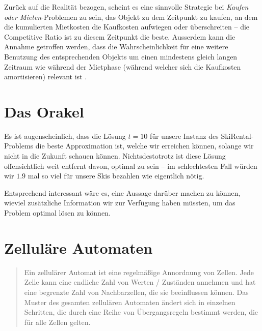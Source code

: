 \documentclass[11pt]{scrreprt} %
\theoremstyle{definition}
\begin{document}
\bigskip
Zurück auf die Realität bezogen, scheint es eine sinnvolle Strategie bei {\sl Kaufen oder Mieten}-Problemen zu sein, das Objekt zu dem Zeitpunkt zu kaufen, an dem die kumulierten Mietkosten die Kaufkosten aufwiegen oder überschreiten -- die Competitive Ratio ist zu diesem Zeitpunkt die beste. Ausserdem kann die Annahme getroffen werden, dass die Wahrscheinlichkeit für eine weitere Benutzung des entsprechenden Objekts um einen mindestens gleich langen Zeitraum wie während der Mietphase (während welcher sich die Kaufkosten amortisieren) relevant ist \cite{Trevisan}.


\section{Das Orakel}

Es ist augenscheinlich, dass die Lösung $t = 10$ für unsere Instanz des {\sc SkiRental}-Problems die beste Approximation ist, welche wir erreichen können, solange wir nicht in die Zukunft schauen können. Nichtsdestotrotz ist diese Lösung offensichtlich weit entfernt davon, optimal zu sein -- im schlechtesten Fall würden wir $1.9$ mal so viel für unsere Skis bezahlen wie eigentlich nötig.

\bigskip
Entsprechend interessant wäre es, eine Aussage darüber machen zu können, wieviel zusätzliche Information wir zur Verfügung haben müssten, um das Problem optimal lösen zu können.























\section{Zelluläre Automaten}

\begin{quote}Ein zellulärer Automat ist eine regelmäßige Annordnung von Zellen. Jede Zelle kann eine endliche Zahl
von Werten / Zuständen annehmen und hat eine begrenzte Zahl von Nachbarzellen, die sie beeinflussen
können. Das Muster des gesamten zellulären Automaten ändert sich in einzelnen Schritten, die durch eine
Reihe von Übergangsregeln bestimmt werden, die für alle Zellen gelten.\cite{beckmann}\end{quote}
\end{document}
